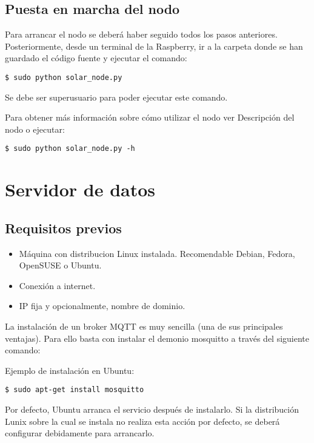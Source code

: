 \subsection{Puesta en marcha del nodo}
\label{makereference8.1.5}
Para arrancar el nodo se deberá haber seguido todos los pasos anteriores. Posteriormente, desde un terminal de la Raspberry, ir a la carpeta donde se han guardado el código fuente y ejecutar el comando: 

\lstset{language=bash}
\begin{lstlisting}[frame=single]
$ sudo python solar_node.py
\end{lstlisting}

Se debe ser superusuario para poder ejecutar este comando.

Para obtener más información sobre cómo utilizar el nodo ver Descripción del nodo o ejecutar:

\lstset{language=bash}
\begin{lstlisting}[frame=single]
$ sudo python solar_node.py -h
\end{lstlisting}

\section{Servidor de datos}
\label{makereference8.2}
\subsection{Requisitos previos}
\label{makereference8.3}
\begin{itemize}
\item Máquina con distribucion Linux instalada. Recomendable Debian, Fedora, OpenSUSE o Ubuntu.
\item Conexión a internet.
\item IP fija y opcionalmente, nombre de dominio.
\end{itemize}

La instalación de un broker MQTT es muy sencilla (una de sus principales ventajas). Para ello basta con instalar el demonio mosquitto a través del siguiente comando:

Ejemplo de instalación en Ubuntu:
\lstset{language=bash}
\begin{lstlisting}[frame=single]
$ sudo apt-get install mosquitto
\end{lstlisting}

Por defecto, Ubuntu arranca el servicio después de instalarlo. Si la distribución Lunix sobre la cual se instala no realiza esta acción por defecto, se deberá configurar debidamente para arrancarlo.

